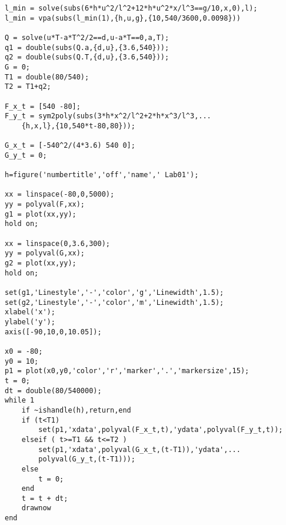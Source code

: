 \documentclass[a4paper,12pt]{article}
\begin{document}
\begin{CJK*}{UTF8}{gbsn}
\begin{lstlisting}
l_min = solve(subs(6*h*u^2/l^2+12*h*u^2*x/l^3==g/10,x,0),l);
l_min = vpa(subs(l_min(1),{h,u,g},{10,540/3600,0.0098}))

Q = solve(u*T-a*T^2/2==d,u-a*T==0,a,T);
q1 = double(subs(Q.a,{d,u},{3.6,540}));
q2 = double(subs(Q.T,{d,u},{3.6,540}));
G = 0;
T1 = double(80/540);
T2 = T1+q2;

F_x_t = [540 -80];
F_y_t = sym2poly(subs(3*h*x^2/l^2+2*h*x^3/l^3,...
    {h,x,l},{10,540*t-80,80}));

G_x_t = [-540^2/(4*3.6) 540 0];
G_y_t = 0;

h=figure('numbertitle','off','name',' Lab01');

xx = linspace(-80,0,5000);
yy = polyval(F,xx);
g1 = plot(xx,yy);
hold on;

xx = linspace(0,3.6,300);
yy = polyval(G,xx);
g2 = plot(xx,yy);
hold on;

set(g1,'Linestyle','-','color','g','Linewidth',1.5);
set(g2,'Linestyle','-','color','m','Linewidth',1.5);
xlabel('x');
ylabel('y');
axis([-90,10,0,10.05]); 

x0 = -80;
y0 = 10;
p1 = plot(x0,y0,'color','r','marker','.','markersize',15); 
t = 0;
dt = double(80/540000);
while 1
    if ~ishandle(h),return,end
    if (t<T1)
        set(p1,'xdata',polyval(F_x_t,t),'ydata',polyval(F_y_t,t));
    elseif ( t>=T1 && t<=T2 )
        set(p1,'xdata',polyval(G_x_t,(t-T1)),'ydata',...
        polyval(G_y_t,(t-T1)));
    else
        t = 0;
    end
    t = t + dt;
    drawnow
end
\end{lstlisting}




\end{CJK*}
\end{document}
